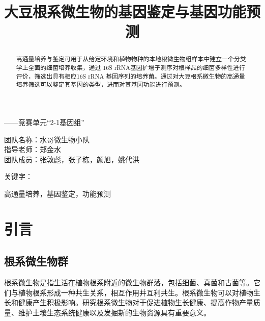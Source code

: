 \documentclass[UTF8]{ctexart}
\author{}
\date{}
\title{\vspace*{-1.5cm} \CJKfontspec{SimHei}大豆根系微生物的基因鉴定与基因功能预测}
\begin{document}
    \maketitle\thispagestyle{fancy}
    \vspace*{-1.5cm}

    \begin{flushright}
        { \heiti  ——竞赛单元“2-1基因组”}

        \vspace*{\baselineskip} 

        团队名称：水哥微生物小队\\
        指导老师：郑金水\\
        团队成员：张敦彪，张子栋，颜旭，姚代洪\\
    \end{flushright}


    \begin{abstract}
        高通量培养与鉴定\textsuperscript{\cite{ref1}}可用于从给定环境和植物物种的本地根微生物组样本中建立一个分类学上全面的细菌培养收集，通过 16S rRNA基因扩增子测序对根样品的细菌多样性进行评价，筛选出具有相应16S rRNA 基因序列的培养菌。通过对大豆根系微生物的高通量培养筛选可以鉴定其基因的类型，进而对其基因功能进行预测。
    \end{abstract}
    

    {\heiti {} \raggedright 关键字：} { 高通量培养，基因鉴定，功能预测}



    \section{引言}

    \subsection{根系微生物群}

    根系微生物是指生活在植物根系附近的微生物群落，包括细菌、真菌和古菌等。它们与植物根系形成一种共生关系，相互作用并互利共生。根系微生物可以对植物生长和健康产生积极影响。研究根系微生物对于促进植物生长健康、提高作物产量质量、维护土壤生态系统健康以及发掘新的生物资源具有重要意义。
    
\end{document}
